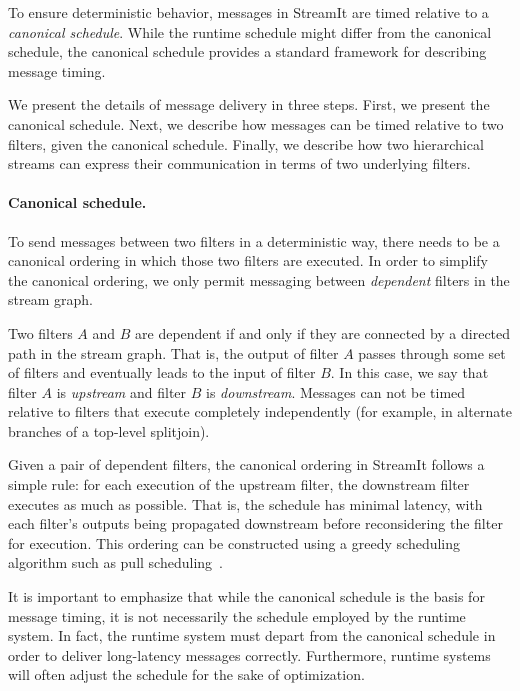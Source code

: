 To ensure deterministic behavior, messages in StreamIt are timed
relative to a {\it canonical schedule}.  While the runtime schedule
might differ from the canonical schedule, the canonical schedule
provides a standard framework for describing message timing.

We present the details of message delivery in three steps.  First, we
present the canonical schedule.  Next, we describe how messages can be
timed relative to two filters, given the canonical schedule.  Finally,
we describe how two hierarchical streams can express their
communication in terms of two underlying filters.

\paragraph{Canonical schedule.}

To send messages between two filters in a deterministic way, there
needs to be a canonical ordering in which those two filters are
executed.  In order to simplify the canonical ordering, we only permit
messaging between {\it dependent} filters in the stream graph.

Two filters $A$ and $B$ are dependent if and only if they are
connected by a directed path in the stream graph.  That is, the output
of filter $A$ passes through some set of filters and eventually leads
to the input of filter $B$.  In this case, we say that filter $A$ is
{\it upstream} and filter $B$ is {\it downstream}.  Messages can not
be timed relative to filters that execute completely independently
(for example, in alternate branches of a top-level splitjoin).

Given a pair of dependent filters, the canonical ordering in StreamIt
follows a simple rule: for each execution of the upstream filter, the
downstream filter executes as much as possible.  That is, the schedule
has minimal latency, with each filter's outputs being propagated
downstream before reconsidering the filter for execution.  This
ordering can be constructed using a greedy scheduling algorithm such
as pull scheduling~\cite{thies05ppopp}.

It is important to emphasize that while the canonical schedule is the
basis for message timing, it is not necessarily the schedule employed
by the runtime system.  In fact, the runtime system must depart from
the canonical schedule in order to deliver long-latency messages
correctly.  Furthermore, runtime systems will often adjust the
schedule for the sake of optimization.

